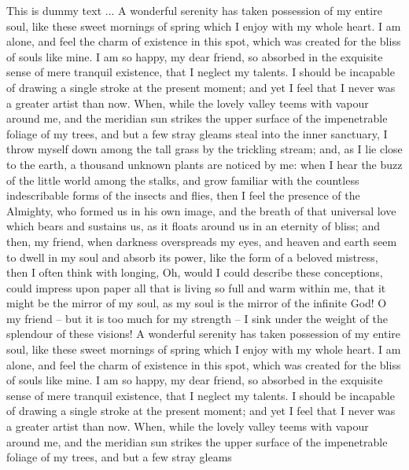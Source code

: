 \documentclass[letterpaper,oneside,12pt]{book}
\begin{document}
This is dummy text ... A wonderful serenity has taken possession of my entire soul, like these sweet mornings of spring which I enjoy with my whole heart. I am alone, and feel the charm of existence in this spot, which was created for the bliss of souls like mine. I am so happy, my dear friend, so absorbed in the exquisite sense of mere tranquil existence, that I neglect my talents. I should be incapable of drawing a single stroke at the present moment; and yet I feel that I never was a greater artist than now. When, while the lovely valley teems with vapour around me, and the meridian sun strikes the upper surface of the impenetrable foliage of my trees, and but a few stray gleams steal into the inner sanctuary, I throw myself down among the tall grass by the trickling stream; and, as I lie close to the earth, a thousand unknown plants are noticed by me: when I hear the buzz of the little world among the stalks, and grow familiar with the countless indescribable forms of the insects and flies, then I feel the presence of the Almighty, who formed us in his own image, and the breath of that universal love which bears and sustains us, as it floats around us in an eternity of bliss; and then, my friend, when darkness overspreads my eyes, and heaven and earth seem to dwell in my soul and absorb its power, like the form of a beloved mistress, then I often think with longing, Oh, would I could describe these conceptions, could impress upon paper all that is living so full and warm within me, that it might be the mirror of my soul, as my soul is the mirror of the infinite God! O my friend -- but it is too much for my strength -- I sink under the weight of the splendour of these visions! A wonderful serenity has taken possession of my entire soul, like these sweet mornings of spring which I enjoy with my whole heart. I am alone, and feel the charm of existence in this spot, which was created for the bliss of souls like mine. I am so happy, my dear friend, so absorbed in the exquisite sense of mere tranquil existence, that I neglect my talents. I should be incapable of drawing a single stroke at the present moment; and yet I feel that I never was a greater artist than now. When, while the lovely valley teems with vapour around me, and the meridian sun strikes the upper surface of the impenetrable foliage of my trees, and but a few stray gleams
	
\end{document}
